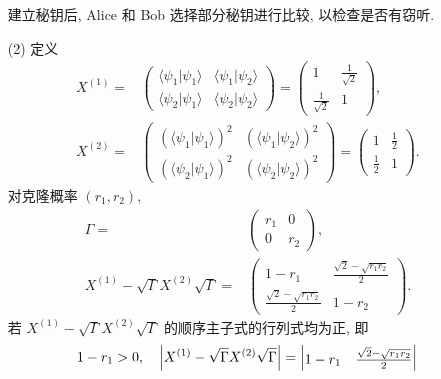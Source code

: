 \documentclass{assignment}
\begin{document}
\begin{sol}
\begin{itemize}
        建立秘钥后, Alice 和 Bob 选择部分秘钥进行比较, 以检查是否有窃听.
        \item[(2)] 定义
        \begin{align}
            X^{(1)}=&\begin{pmatrix}
                \langle\psi_1\vert\psi_1\rangle&\langle\psi_1\vert\psi_2\rangle\\
                \langle\psi_2\vert\psi_1\rangle&\langle\psi_2\vert\psi_2\rangle
            \end{pmatrix}=\begin{pmatrix}
                1&\frac{1}{\sqrt{2}}\\
                \frac{1}{\sqrt{2}}&1
            \end{pmatrix},\\
            X^{(2)}=&\begin{pmatrix}
                (\langle\psi_1\vert\psi_1\rangle)^2&(\langle\psi_1\vert\psi_2\rangle)^2\\
                (\langle\psi_2\vert\psi_1\rangle)^2&(\langle\psi_2\vert\psi_2\rangle)^2
            \end{pmatrix}=\begin{pmatrix}
                1&\frac{1}{2}\\
                \frac{1}{2}&1
            \end{pmatrix}.
        \end{align}
        对克隆概率 $(r_1,r_2)$,
        \begin{align}
            \Gamma=&\begin{pmatrix}
                r_1&0\\
                0&r_2
            \end{pmatrix},\\
            X^{(1)}-\sqrt{\Gamma}X^{(2)}\sqrt{\Gamma}=&\begin{pmatrix}
                1-r_1&\frac{\sqrt{2}-\sqrt{r_1r_2}}{2}\\
                \frac{\sqrt{2}-\sqrt{r_1r_2}}{2}&1-r_2
            \end{pmatrix}.
        \end{align}
        若 $X^{(1)}-\sqrt{\Gamma}X^{(2)}\sqrt{\Gamma}$ 的顺序主子式的行列式均为正, 即
        \begin{align}
            1-r_1>0,\quad\left\lvert X^{(1)}-\sqrt{\Gamma}X^{(2)}\sqrt{\Gamma}\right\rvert=\begin{vmatrix}
                1-r_1&\frac{\sqrt{2}-\sqrt{r_1r_2}}{2}\\

\end{vmatrix}
\end{align}
\end{itemize}
\end{sol}
\end{document}

